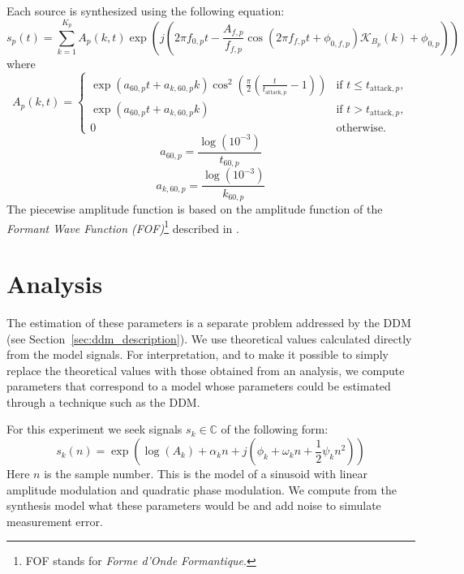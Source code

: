 Each source is synthesized using the following equation:
\begin{equation}
    s_{p}(t) = \sum_{k=1}^{K_{p}} A_{p}(k,t) \exp(j(2\pi
    f_{0,p}t - \frac{A_{f,p}}{f_{f,p}} \cos(2\pi f_{f,p} t +
    \phi_{0,f,p}) \mathcal{K}_{B_{p}}(k) + \phi_{0,p}))
\end{equation}
where
\begin{equation}
    A_{p}(k,t) = 
    \begin{cases}
        \exp(a_{60,p} t + a_{k,60,p}k) \cos^{2}
        (\frac{\pi}{2}(\frac{t}{t_{\text{attack},p}} - 1)) & \text{if } t \leq
        t_{\text{attack},p},\\
        \exp(a_{60,p} t + a_{k,60,p}k) & \text{if } t > t_{\text{attack},p},\\
        0 & \text{otherwise}.
    \end{cases}
\end{equation}
\begin{equation}
    a_{60,p} = \frac{\log(10^{-3})}{t_{60,p}}
\end{equation}
\begin{equation}
    a_{k,60,p} = \frac{\log(10^{-3})}{k_{60,p}} 
\end{equation}
The piecewise amplitude function is based on the amplitude function of the
\textit{Formant Wave Function (FOF)}\footnote{FOF stands for \textit{Forme
d'Onde Formantique}.} described in \cite[p.~19]{rodet1984chant}.

\section{Analysis}

The estimation of these parameters is a separate problem addressed by the
DDM (see Section~\ref{sec:ddm_description}). We use theoretical values calculated
directly from the model signals. For interpretation, and to make it possible to
simply replace the theoretical values with those obtained from an analysis, we
compute parameters that correspond to a model whose parameters could be
estimated through a technique such as the DDM.

For this experiment we seek signals $s_k \in \mathbb{C}$ of the following form:
\begin{equation}
    s_{k}(n) = \exp(\log(A_{k}) + \alpha_{k}n + j(\phi_{k} + \omega_{k}n +
    \frac{1}{2} \psi_{k} n^{2}))
    \label{eq:rm_model}
\end{equation}
Here $n$ is the sample number. This is the model of a sinusoid with linear
amplitude modulation and quadratic phase modulation. We compute from the
synthesis model what these parameters would be and add noise to simulate
measurement error.

